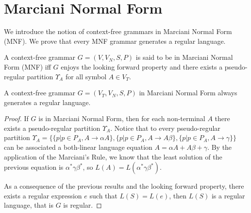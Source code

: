 \section{Marciani Normal Form}
\label{sec:marciani-normal-form}

We introduce the notion of context-free grammars in Marciani Normal Form (MNF).
We prove that every MNF grammar generates a regular language.

\begin{definition}
	\label{dfn:mnf}
	A context-free grammar $G=(V,V_{N},S,P)$ is said to be in Marciani Normal
	Form (MNF) iff $G$ enjoys the looking forward property and there exists a
	pseudo-regular partition $\Upsilon_{A}$ for all symbol $A\in V_{T}$.
\end{definition}

\begin{theorem}
	\label{thm:mnf}
	A context-free grammar $G=(V_{T},V_{N},S,P)$ in Marciani Normal Form always
	generates a regular language.

	\begin{proof}
		If $G$ is in Marciani Normal Form, then for each non-terminal $A$ there
		exists a pseudo-regular partition $\Upsilon_{A}$.
		Notice that to every pseudo-regular partition
		$\Upsilon_{A}=\{\{p|p\in P_{A},A\rightarrow\alpha A\},
		\{p|p\in P_{A},A\rightarrow A\beta\},\{p|p\in P_{A},A\rightarrow\gamma\}\}$
		can be associated a both-linear language equation $A=\alpha A+A\beta+\gamma$.
		By the application of the Marciani's Rule, we know that the least
		solution of the previous equation is $\alpha^{*}\gamma\beta^{*}$,
		so $L(A)=L(\alpha^{*}\gamma\beta^{*})$.

		As a consequence of the previous results and the looking forward property,
		there exists a regular expression $e$ such that $L(S)=L(e)$, then $L(S)$ 
		is a regular language, that is $G$ is regular.
	\end{proof}
\end{theorem}
